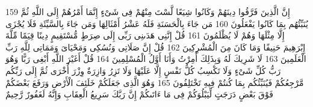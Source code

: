 {\tiny\colorbox{cl_aya}{159}} إِنَّ الَّذِينَ فَرَّقُوا دِينَهُمْ وَكَانُوا شِيَعًا لَّسْتَ مِنْهُمْ فِى شَىْءٍ إِنَّمَا أَمْرُهُمْ إِلَى اللَّهِ ثُمَّ يُنَبِّئُهُم بِمَا كَانُوا يَفْعَلُونَ
{\tiny\colorbox{cl_aya}{160}} مَن جَاءَ بِالْحَسَنَةِ فَلَهُ عَشْرُ أَمْثَالِهَا وَمَن جَاءَ بِالسَّيِّئَةِ فَلَا يُجْزَى إِلَّا مِثْلَهَا وَهُمْ لَا يُظْلَمُونَ
{\tiny\colorbox{cl_aya}{161}} قُلْ إِنَّنِى هَدَىنِى رَبِّى إِلَى صِرَطٍ مُّسْتَقِيمٍ دِينًا قِيَمًا مِّلَّةَ إِبْرَهِيمَ حَنِيفًا وَمَا كَانَ مِنَ الْمُشْرِكِينَ
{\tiny\colorbox{cl_aya}{162}} قُلْ إِنَّ صَلَاتِى وَنُسُكِى وَمَحْيَاىَ وَمَمَاتِى لِلَّهِ رَبِّ الْعَلَمِينَ
{\tiny\colorbox{cl_aya}{163}} لَا شَرِيكَ لَهُ وَبِذَلِكَ أُمِرْتُ وَأَنَا أَوَّلُ الْمُسْلِمِينَ
{\tiny\colorbox{cl_aya}{164}} قُلْ أَغَيْرَ اللَّهِ أَبْغِى رَبًّا وَهُوَ رَبُّ كُلِّ شَىْءٍ وَلَا تَكْسِبُ كُلُّ نَفْسٍ إِلَّا عَلَيْهَا وَلَا تَزِرُ وَازِرَةٌ وِزْرَ أُخْرَى ثُمَّ إِلَى رَبِّكُم مَّرْجِعُكُمْ فَيُنَبِّئُكُم بِمَا كُنتُمْ فِيهِ تَخْتَلِفُونَ
{\tiny\colorbox{cl_aya}{165}} وَهُوَ الَّذِى جَعَلَكُمْ خَلَئِفَ الْأَرْضِ وَرَفَعَ بَعْضَكُمْ فَوْقَ بَعْضٍ دَرَجَتٍ لِّيَبْلُوَكُمْ فِى مَا ءَاتَىكُمْ إِنَّ رَبَّكَ سَرِيعُ الْعِقَابِ وَإِنَّهُ لَغَفُورٌ رَّحِيمٌ
